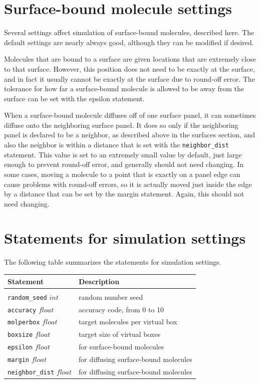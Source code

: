 \documentclass {book}
\newcommand {\ttt} {\texttt}
\begin{document}
\section{Surface-bound molecule settings}

Several settings affect simulation of surface-bound molecules, described here. The default settings are nearly always good, although they can be modified if desired.

Molecules that are bound to a surface are given locations that are extremely close to that surface. However, this position does not need to be exactly at the surface, and in fact it usually cannot be exactly at the surface due to round-off error. The tolerance for how far a surface-bound molecule is allowed to be away from the surface can be set with the epsilon statement.

When a surface-bound molecule diffuses off of one surface panel, it can sometimes diffuse onto the neighboring surface panel. It does so only if the neighboring panel is declared to be a neighbor, as described above in the surfaces section, and also the neighbor is within a distance that is set with the \ttt{neighbor\_dist} statement. This value is set to an extremely small value by default, just large enough to prevent round-off error, and generally should not need changing. In some cases, moving a molecule to a point that is exactly on a panel edge can cause problems with round-off errors, so it is actually moved just inside the edge by a distance that can be set by the margin statement. Again, this should not need changing.

\section{Statements for simulation settings}

The following table summarizes the statements for simulation settings.

\begin{longtable}[c]{ll}
Statement & Description\\
\hline \\
\ttt{random\_seed} $int$ & random number seed\\
\ttt{accuracy} $float$ & accuracy code, from 0 to 10\\
\ttt{molperbox} $float$ & target molecules per virtual box\\
\ttt{boxsize} $float$ & target size of virtual boxes\\
\ttt{epsilon} $float$ & for surface-bound molecules\\
\ttt{margin} $float$ & for diffusing surface-bound molecules\\
\ttt{neighbor\_dist} $float$ & for diffusing surface-bound molecules
\end{longtable}
\end{document}
